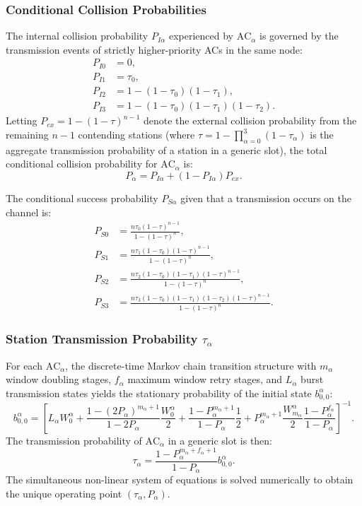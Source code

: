 \subsubsection{Conditional Collision Probabilities}
The internal collision probability $P_{I\alpha}$ experienced by $\mathrm{AC}_\alpha$ is governed by the transmission events of strictly higher-priority ACs in the same node:
\begin{align}
    P_{I0} &= 0, \\
    P_{I1} &= \tau_0, \\
    P_{I2} &= 1 - (1 - \tau_0)(1 - \tau_1), \\
    P_{I3} &= 1 - (1 - \tau_0)(1 - \tau_1)(1 - \tau_2).
\end{align}
Letting $P_{ex} = 1 - (1 - \tau)^{n-1}$ denote the external collision probability from the remaining $n-1$ contending stations (where $\tau = 1 - \prod_{\alpha=0}^3 (1 - \tau_\alpha)$ is the aggregate transmission probability of a station in a generic slot), the total conditional collision probability for $\mathrm{AC}_\alpha$ is:
\begin{equation}
    P_\alpha = P_{I\alpha} + (1 - P_{I\alpha}) P_{ex}.
\end{equation}

The conditional success probability $P_{S\alpha}$ given that a transmission occurs on the channel is:
\begin{align}
    P_{S0} &= \frac{n \tau_0 (1 - \tau)^{n-1}}{1 - (1 - \tau)^n}, \\
    P_{S1} &= \frac{n \tau_1 (1 - \tau_0)(1 - \tau)^{n-1}}{1 - (1 - \tau)^n}, \\
    P_{S2} &= \frac{n \tau_2 (1 - \tau_0)(1 - \tau_1)(1 - \tau)^{n-1}}{1 - (1 - \tau)^n}, \\
    P_{S3} &= \frac{n \tau_3 (1 - \tau_0)(1 - \tau_1)(1 - \tau_2)(1 - \tau)^{n-1}}{1 - (1 - \tau)^n}.
\end{align}

\subsubsection{Station Transmission Probability $\tau_\alpha$}
For each $\mathrm{AC}_\alpha$, the discrete-time Markov chain transition structure with $m_\alpha$ window doubling stages, $f_\alpha$ maximum window retry stages, and $L_\alpha$ burst transmission states yields the stationary probability of the initial state $b_{0,0}^\alpha$:
\begin{equation}
    b_{0,0}^\alpha = \left[ L_\alpha W_0^\alpha + \frac{1 - (2P_\alpha)^{m_\alpha+1}}{1 - 2P_\alpha}\frac{W_0^\alpha}{2} + \frac{1 - P_\alpha^{m_\alpha+1}}{1 - P_\alpha}\frac{1}{2} + P_\alpha^{m_\alpha+1}\frac{W_{m_\alpha}^\alpha}{2}\frac{1 - P_\alpha^{f_\alpha}}{1 - P_\alpha} \right]^{-1}.
\end{equation}
The transmission probability of $\mathrm{AC}_\alpha$ in a generic slot is then:
\begin{equation}
    \tau_\alpha = \frac{1 - P_\alpha^{m_\alpha + f_\alpha + 1}}{1 - P_\alpha} b_{0,0}^\alpha.
\end{equation}
The simultaneous non-linear system of equations is solved numerically to obtain the unique operating point $(\tau_\alpha, P_\alpha)$.

